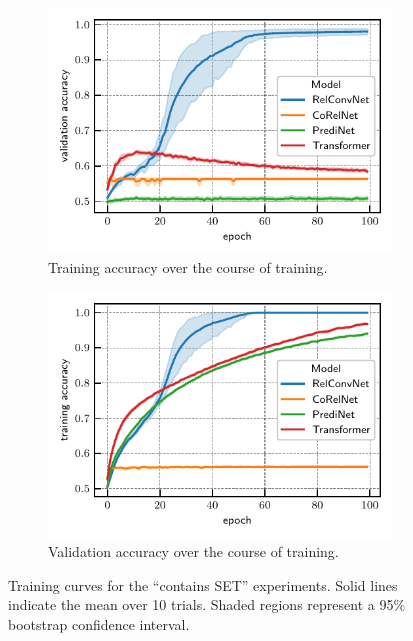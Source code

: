 \begin{figure}
    \begin{subfigure}{0.5\textwidth}
        \centering
        \includegraphics[width=\textwidth]{figs/experiments/contains_set_training_curves_trainacc.pdf}
        \caption{Training accuracy over the course of training.}\label{fig:contains_set_training_curves_trainacc}
    \end{subfigure}
    \begin{subfigure}{0.5\textwidth}
        \centering
        \includegraphics[width=\textwidth]{figs/experiments/contains_set_training_curves_valacc.pdf}
        \caption{Validation accuracy over the course of training.}\label{fig:contains_set_training_curves_valacc}
    \end{subfigure}
    \caption{Training curves for the ``contains SET'' experiments. Solid lines indicate the mean over 10 trials. Shaded regions represent a 95\% bootstrap confidence interval.}\label{fig:contains_set_training_curves}
\end{figure}

